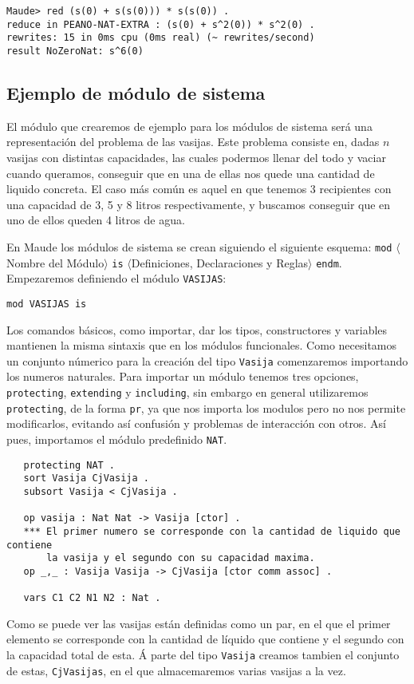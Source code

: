 {\codesize
\begin{verbatim}
Maude> red (s(0) + s(s(0))) * s(s(0)) .
reduce in PEANO-NAT-EXTRA : (s(0) + s^2(0)) * s^2(0) .
rewrites: 15 in 0ms cpu (0ms real) (~ rewrites/second)
result NoZeroNat: s^6(0)
\end{verbatim}
}

\subsection{Ejemplo de módulo de sistema}

El módulo que crearemos de ejemplo para los módulos de sistema será una representación del problema de las vasijas. Este problema consiste en, dadas $n$ vasijas con distintas capacidades, las cuales podermos llenar del todo y vaciar cuando queramos, conseguir que en una de ellas nos quede una cantidad de liquido concreta. El caso más común es aquel en que tenemos $3$ recipientes con una capacidad de 3, 5 y 8 litros respectivamente, y buscamos conseguir que en uno de ellos queden 4 litros de agua. \par

En Maude los módulos de sistema se crean siguiendo el siguiente esquema: \texttt{mod} $\langle$Nombre del Módulo$\rangle$ \texttt{is} $\langle$Definiciones, Declaraciones y Reglas$\rangle$ \texttt{endm}. Empezaremos definiendo el módulo \texttt{VASIJAS}: \par

{\codesize
\begin{verbatim}
mod VASIJAS is
\end{verbatim}
}

Los comandos básicos, como importar, dar los tipos, constructores y variables mantienen la misma sintaxis que en los módulos funcionales. Como necesitamos un conjunto númerico para la creación del tipo \texttt{Vasija} comenzaremos importando los numeros naturales. Para importar un módulo tenemos tres opciones, \texttt{protecting}, \texttt{extending} y \texttt{including}, sin embargo en general utilizaremos \texttt{protecting}, de la forma \texttt{pr}, ya que nos importa los modulos pero no nos permite modificarlos, evitando así confusión y problemas de interacción con otros. Así pues, importamos el módulo predefinido \texttt{NAT}. \par

{\codesize
\begin{verbatim}
   protecting NAT .
   sort Vasija CjVasija .
   subsort Vasija < CjVasija .

   op vasija : Nat Nat -> Vasija [ctor] .
   *** El primer numero se corresponde con la cantidad de liquido que contiene 
       la vasija y el segundo con su capacidad maxima.
   op _,_ : Vasija Vasija -> CjVasija [ctor comm assoc] .

   vars C1 C2 N1 N2 : Nat .
\end{verbatim}
}
Como se puede ver las vasijas están definidas como un par, en el que el primer elemento se corresponde con la cantidad de líquido que contiene y el segundo con la capacidad total de esta. Á parte del tipo \texttt{Vasija} creamos tambien el conjunto de estas, \texttt{CjVasijas}, en el que almacemaremos varias vasijas a la vez.\par 

